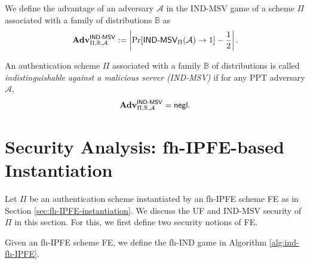 




We define the advantage of an adversary $\mathcal{A}$ in the \textsf{IND-MSV} game of a scheme $\Pi$ associated with a family of distributions $\mathbb{B}$ as
\[
	\mathbf{Adv}^{\textsf{IND-MSV}}_{\Pi, \mathbb{B}, \mathcal{A}} := \left |\Pr[\textsf{IND-MSV}_{\Pi}(\mathcal{A}) \to 1] - \frac{1}{2} \right|.
\]

An authentication scheme $\Pi$ associated with a family $\mathbb{B}$ of distributions is called \emph{indistinguishable against a malicious server (IND-MSV)} if for any PPT adversary $\mathcal{A}$,
\[
	\mathbf{Adv}^{\textsf{IND-MSV}}_{\Pi, \mathbb{B}, \mathcal{A}} = \mathsf{negl}.
\]


\section{Security Analysis: fh-IPFE-based Instantiation}
\label{sec:security_analysis:fh-IPFE}

Let $\Pi$ be an authentication scheme instantiated by an fh-IPFE scheme \textsf{FE} as in Section \ref{sec:fh-IPFE-instantiation}. We discuss the UF and IND-MSV security of $\Pi$ in this section. For this, we first define two security notions of \textsf{FE}.

Given an fh-IPFE scheme \textsf{FE}, we define the \textsf{fh-IND} game \cite{cryptoeprint:2023/481} in Algorithm \ref{alg:ind-fh-IPFE}.

